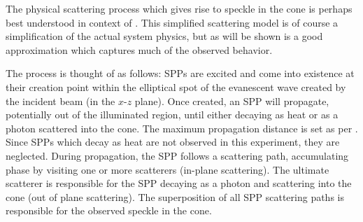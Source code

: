 The physical scattering process which gives rise to speckle in the cone is
perhaps best understood in context of .  This
simplified scattering model is of course a simplification of the actual system
physics, but as will be shown is a good approximation which captures much of
the observed behavior.

The process is thought of as follows: SPPs are excited and come into existence
at their creation point within the elliptical spot of the evanescent wave
created by the incident beam (in the $x$-$z$ plane).  Once created, an SPP
will propagate, potentially out of the illuminated region, until either
decaying as heat or as a photon scattered into the cone.  The maximum
propagation distance is set as per .  Since SPPs
which decay as heat are not observed in this experiment, they are neglected.
During propagation, the SPP follows a scattering path, accumulating phase by
visiting one or more scatterers (in-plane scattering).  The ultimate scatterer
is responsible for the SPP decaying as a photon and scattering into the cone
(out of plane scattering).  The superposition of all SPP scattering paths is
responsible for the observed speckle in the cone.

